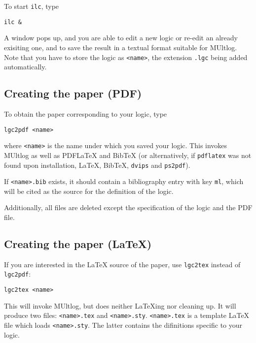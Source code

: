 \documentclass[]{article}
\newcommand{\passthrough}[1]{#1}
\begin{document}
To start \passthrough{\lstinline!ilc!}, type

\begin{lstlisting}
ilc &
\end{lstlisting}

A window pops up, and you are able to edit a new logic or re-edit an
already exisiting one, and to save the result in a textual format
suitable for MUltlog. Note that you have to store the logic as
\passthrough{\lstinline!<name>!}, the extension
\passthrough{\lstinline!.lgc!} being added automatically.

\hypertarget{creating-the-paper-pdf}{%
\subsection{Creating the paper (PDF)}\label{creating-the-paper-pdf}}

To obtain the paper corresponding to your logic, type

\begin{lstlisting}
lgc2pdf <name>
\end{lstlisting}

where \passthrough{\lstinline!<name>!} is the name under which you saved
your logic. This invokes MUltlog as well as PDFLaTeX and BibTeX (or
alternatively, if \passthrough{\lstinline!pdflatex!} was not found upon
installation, LaTeX, BibTeX, \passthrough{\lstinline!dvips!} and
\passthrough{\lstinline!ps2pdf!}).

If \passthrough{\lstinline!<name>.bib!} exists, it should contain a
bibliography entry with key \passthrough{\lstinline!ml!}, which will be
cited as the source for the definition of the logic.

Additionally, all files are deleted except the specification of the
logic and the PDF file.

\hypertarget{creating-the-paper-latex}{%
\subsection{Creating the paper (LaTeX)}\label{creating-the-paper-latex}}

If you are interested in the LaTeX source of the paper, use
\passthrough{\lstinline!lgc2tex!} instead of
\passthrough{\lstinline!lgc2pdf!}:

\begin{lstlisting}
lgc2tex <name>
\end{lstlisting}

This will invoke MUltlog, but does neither LaTeXing nor cleaning up. It
will produce two files: \passthrough{\lstinline!<name>.tex!} and
\passthrough{\lstinline!<name>.sty!}.
\passthrough{\lstinline!<name>.tex!} is a template LaTeX file which
loads \passthrough{\lstinline!<name>.sty!}. The latter contains the
difinitions specific to your logic.
\end{document}
